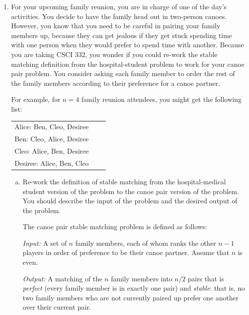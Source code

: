 \documentclass[11pt]{article}
\begin{document}



\begin{enumerate}
\item
For your upcoming family reunion, you are in charge of one of the day's activities.
You decide to have the family head out in two-person canoes. However, you know that
you need to be careful in pairing your family members up, because they can get jealous
if they get stuck spending time with one person when they would prefer to spend time with another.
Because you are taking CSCI 332, you wonder if you could re-work the stable matching
definition from the hospital-student problem to work for your canoe pair problem. You consider
asking each family member to order the rest of the family members according to their
preference for a canoe partner.

For example, for $n=4$ family reunion attendees, you might get the following list:

\begin{center}
\begin{tabular}{ c c c }
    Alice: Ben, Cleo, Desiree \\
    Ben: Cleo, Alice, Desiree \\
    Cleo: Alice, Ben, Desiree\\
    Desiree: Alice, Ben, Cleo
\end{tabular}
\end{center}


\begin{enumerate}[(a)]
    \item 
Re-work the definition of stable matching from the hospital-medical student
        version of the problem to the canoe pair version of the problem.
        You should describe the input of the problem and the desired output of the problem.

\begin{Solution}
    The canoe pair stable matching problem is defined as follows:

    \noindent \emph{Input:} A set of $n$ family members, each of whom ranks the other
    $n-1$ players in order of preference to be their canoe partner. Assume that $n$
    is even.

    \noindent \emph{Output:} A matching of the $n$ family members into $n/2$
    pairs that is \emph{perfect} (every family member is in exactly one pair) and \emph{stable}: that is,
    no two family members who are not currently paired up prefer one another over their current
    pair.
    

\end{Solution}
\end{enumerate}
\end{enumerate}
\end{document}
